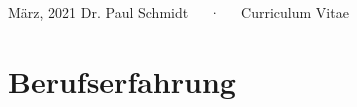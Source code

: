 \documentclass[11pt, a4paper]{awesome-cv}
\begin{document}
\makecvheader

\makecvfooter
  {März, 2021}
    {Dr. Paul Schmidt~~~·~~~Curriculum Vitae}
  {\thepage}






\hypertarget{berufserfahrung}{%
\section{Berufserfahrung}\label{berufserfahrung}}
\end{document}
